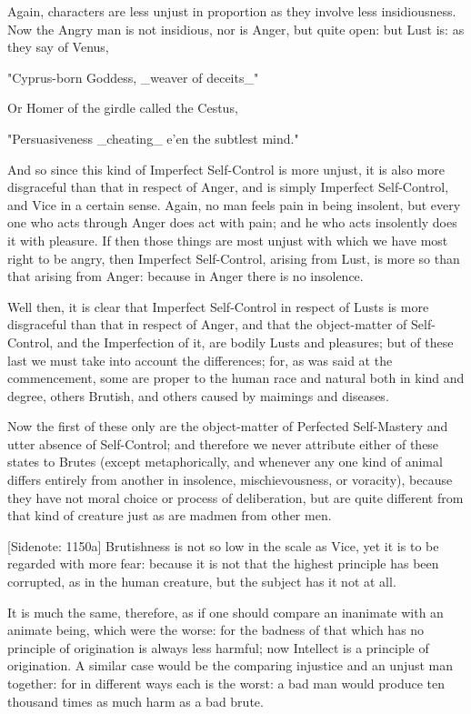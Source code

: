 Again, characters are less unjust in proportion as they involve less
insidiousness. Now the Angry man is not insidious, nor is Anger, but
quite open: but Lust is: as they say of Venus,

  "Cyprus-born Goddess, _weaver of deceits_"

Or Homer of the girdle called the Cestus,

  "Persuasiveness _cheating_ e'en the subtlest mind."

And so since this kind of Imperfect Self-Control is more unjust, it
is also more disgraceful than that in respect of Anger, and is simply
Imperfect Self-Control, and Vice in a certain sense. Again, no man feels
pain in being insolent, but every one who acts through Anger does act
with pain; and he who acts insolently does it with pleasure. If then
those things are most unjust with which we have most right to be angry,
then Imperfect Self-Control, arising from Lust, is more so than that
arising from Anger: because in Anger there is no insolence.

Well then, it is clear that Imperfect Self-Control in respect of
Lusts is more disgraceful than that in respect of Anger, and that the
object-matter of Self-Control, and the Imperfection of it, are bodily
Lusts and pleasures; but of these last we must take into account the
differences; for, as was said at the commencement, some are proper to
the human race and natural both in kind and degree, others Brutish, and
others caused by maimings and diseases.

Now the first of these only are the object-matter of Perfected
Self-Mastery and utter absence of Self-Control; and therefore we never
attribute either of these states to Brutes (except metaphorically,
and whenever any one kind of animal differs entirely from another in
insolence, mischievousness, or voracity), because they have not moral
choice or process of deliberation, but are quite different from that
kind of creature just as are madmen from other men.

[Sidenote: 1150a] Brutishness is not so low in the scale as Vice, yet
it is to be regarded with more fear: because it is not that the highest
principle has been corrupted, as in the human creature, but the subject
has it not at all.

It is much the same, therefore, as if one should compare an inanimate
with an animate being, which were the worse: for the badness of that
which has no principle of origination is always less harmful; now
Intellect is a principle of origination. A similar case would be the
comparing injustice and an unjust man together: for in different ways
each is the worst: a bad man would produce ten thousand times as much
harm as a bad brute.

